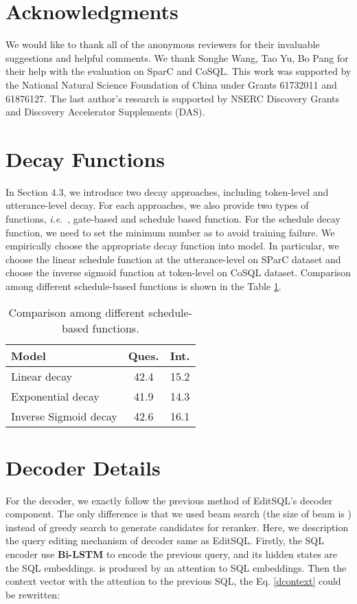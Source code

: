 \documentclass[letterpaper]{article} \usepackage{aaai21}  \usepackage{times}  \usepackage{helvet} \usepackage{courier}  \usepackage[hyphens]{url}  \usepackage{graphicx} \urlstyle{rm} \def\UrlFont{\rm}  \usepackage{natbib}  \usepackage{caption} \frenchspacing  \setlength{\pdfpagewidth}{8.5in}  \setlength{\pdfpageheight}{11in}
\def\ie{\emph{i.e}.~}
\begin{document}
\section*{Acknowledgments}
We would like to thank all of the anonymous reviewers for their invaluable suggestions and helpful comments.
We thank Songhe Wang, Tao Yu, Bo Pang for their help with the evaluation on SparC and CoSQL. 
This work was supported by the National Natural Science Foundation of China under Grants 61732011 and 61876127.
The last author's research is supported by NSERC Discovery Grants and Discovery Accelerator Supplements (DAS).




\clearpage
\appendix

\section{Decay Functions}
In Section 4.3, we introduce two decay approaches, including token-level and utterance-level decay.
For each approaches, we also provide two types of functions, \ie, gate-based and schedule based function. For the schedule decay function, we need to set the minimum number  as  to avoid training failure.
We empirically choose the appropriate decay function into model.
In particular, we choose the linear schedule function at the utterance-level on SParC dataset and choose the  inverse sigmoid function at token-level on CoSQL dataset. 
Comparison among different schedule-based functions is shown in the Table \ref{decay_app}.

\begin{table}[!htbp]
	\centering
	\begin{tabular}{lcc}
		\toprule 
		\textbf{Model} & {Ques.} & {Int.} \\
		\midrule
		Linear decay & 42.4 & 15.2  \\
		Exponential decay & 41.9 & 14.3  \\
		Inverse Sigmoid decay & 42.6 & 16.1 \\
		\bottomrule
	\end{tabular}
	\caption{Comparison among different schedule-based functions.}
	\label{decay_app}
\end{table}



\section{Decoder Details}
For the decoder, we exactly follow the previous method of EditSQL’s \cite{DBLP:conf/emnlp/ZhangYESXLSXSR19} decoder component.
The only difference is that we used beam search (the size of beam is ) instead of greedy search to generate candidates for reranker.
Here, we description the query editing mechanism of decoder same as EditSQL.
Firstly, the SQL encoder use \textbf{Bi-LSTM} to encode the previous query, and its hidden states are the SQL embeddings.
 is produced by an attention to SQL embeddings.
Then the context vector with the attention to the previous SQL, the Eq. \ref{dcontext} could be rewritten:
\end{document}
